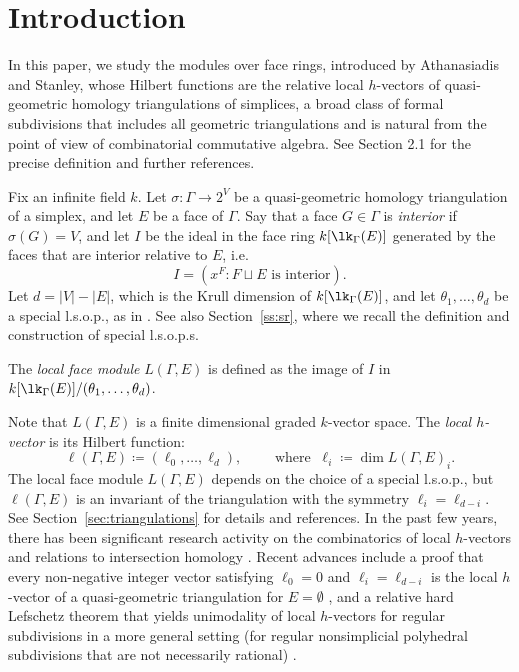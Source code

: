 \section{Introduction}

In this paper, we study the modules over face rings, introduced by Athanasiadis and Stanley, whose Hilbert functions are the relative local $h$-vectors of quasi-geometric homology triangulations of simplices, a broad class of formal subdivisions that includes all geometric triangulations and is natural from the point of view of combinatorial commutative algebra.  See Section 2.1 for the precise definition and further references.

Fix an infinite field $k$.  Let $\sigma \colon \Gamma \to 2^V$ be a quasi-geometric homology triangulation of a simplex, and let $E$ be a face of $\Gamma$. Say that a face $G \in \Gamma$ is \emph{interior} if $\sigma(G) = V$, and let $I$ be the ideal in the face ring $k[\lk_\Gamma(E)]$ generated by the faces that are interior relative to $E$, i.e. 
\[
 I = (x^F : F \sqcup E \mbox{ is interior} ).
\]
Let $d = |V|-|E|$, which is the Krull dimension of $k[\lk_\Gamma(E)]$, and let $\theta_1, \ldots, \theta_{d}$ be a special l.s.o.p., as in \cite{Stanley92, Athanasiadis12b}. See also Section~\ref{ss:sr}, where we recall the definition and construction of special l.s.o.p.s.

\begin{definition}
The \emph{local face module} $L(\Gamma,E)$ is defined as the image of $I$ in $k[\lk_\Gamma(E)]/(\theta_1, \ldots, \theta_d)$.
\end{definition}

Note that $L(\Gamma,E)$ is a finite dimensional graded $k$-vector space. The \emph{local $h$-vector} is its Hilbert function: 
\[
\ell(\Gamma, E)  \coloneqq  (\ell_0, \ldots, \ell_{d}), \quad \quad \mbox{ where } \ \ell_i  \coloneqq  \dim L(\Gamma,E)_i.
\]
The local face module $L(\Gamma,E)$ depends on the choice of a special l.s.o.p., but $\ell(\Gamma,E)$ is an invariant of the triangulation with the symmetry $\ell_i = \ell_{d- i}$. See Section~\ref{sec:triangulations} for details and references. In the past few years, there has been significant research activity on the combinatorics of local $h$-vectors and relations to intersection homology \cite{Athanasiadis16, KatzStapledon16, Stapledon17, deCataldoMiglioriniMustata18}.  Recent advances include a proof that every non-negative integer vector satisfying $\ell_0 = 0$ and $\ell_i = \ell_{d-i}$ is the local $h$-vector of a quasi-geometric triangulation for $E = \emptyset$ \cite{JKMS}, and a relative hard Lefschetz theorem that yields unimodality of local $h$-vectors for regular subdivisions in a more general setting (for regular nonsimplicial polyhedral subdivisions that are not necessarily rational) \cite{Karu19}.

